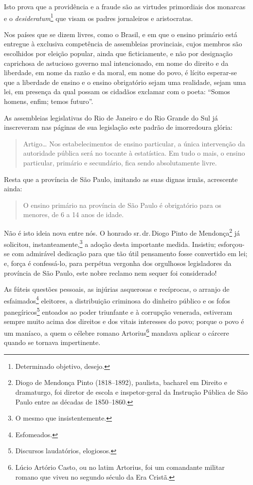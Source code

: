 Isto prova que a providência e a fraude são as virtudes primordiais dos
monarcas e o \textit{desideratum}\footnote{Determinado objetivo, desejo.} que
visam os padres jornaleiros e aristocratas.

Nos países que se dizem livres, como o Brasil, e em que o ensino
primário está entregue à exclusiva competência de assembleias
provinciais, cujos membros são escolhidos por eleição popular, ainda que
ficticiamente, e não por designação caprichosa de astucioso governo mal
intencionado, em nome do direito e da liberdade, em nome da razão e da
moral, em nome do povo, é lícito esperar-se que a liberdade de ensino e
o ensino obrigatório sejam uma realidade, sejam uma lei, em presença da
qual possam os cidadãos exclamar com o poeta: ``Somos homens, enfim;
temos futuro''.

As assembleias legislativas do Rio de Janeiro e do Rio Grande do Sul já
inscreveram nas páginas de sua legislação este padrão de imorredoura
glória:

\begin{quote}
Artigo\ldots{} Nos estabelecimentos de ensino particular, a única
intervenção da autoridade pública será no tocante à estatística. Em tudo
o mais, o ensino particular, primário e secundário, fica sendo
absolutamente livre.
\end{quote}

Resta que a província de São Paulo, imitando as suas dignas irmãs,
acrescente ainda:


\begin{quote}
O ensino primário na província de São Paulo é obrigatório para os
menores, de 6 a 14 anos de idade.
\end{quote}

Não é isto ideia nova entre nós. O honrado sr.\,dr.\,Diogo Pinto de
Mendonça\footnote{Diogo de Mendonça Pinto (1818--1892), paulista,
  bacharel em Direito e dramaturgo, foi diretor de escola e
  inspetor-geral da Instrução Pública de São Paulo entre as décadas de
  1850--1860.} já solicitou, instanteamente,\footnote{O mesmo que
  insistentemente.} a adoção desta importante medida. Insistiu;
esforçou-se com admirável dedicação para que tão útil pensamento fosse
convertido em lei; e, força é confessá-lo, para perpétua vergonha dos
orgulhosos legisladores da província de São Paulo, este nobre reclamo nem
sequer foi considerado!

As fúteis questões pessoais, as injúrias asquerosas e recíprocas, o
arranjo de esfaimados\footnote{Esfomeados.} eleitores, a distribuição
criminosa do dinheiro público e os fofos panegíricos\footnote{
  Discursos laudatórios, elogiosos.} entoados ao poder triunfante e à
corrupção venerada, estiveram sempre muito acima dos direitos e dos
vitais interesses do povo; porque o povo é um maníaco, a quem o célebre
romano Artorius\footnote{Lúcio Artório Casto, ou no latim Artorius,
  foi um comandante militar romano que viveu no segundo século da Era
  Cristã.} mandava aplicar o cárcere quando se tornava impertinente.

